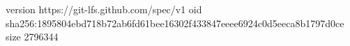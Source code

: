 version https://git-lfs.github.com/spec/v1
oid sha256:1895804ebd718b72ab6fd61bee16302f433847eeee6924c0d5eeca8b1797d0ce
size 2796344
